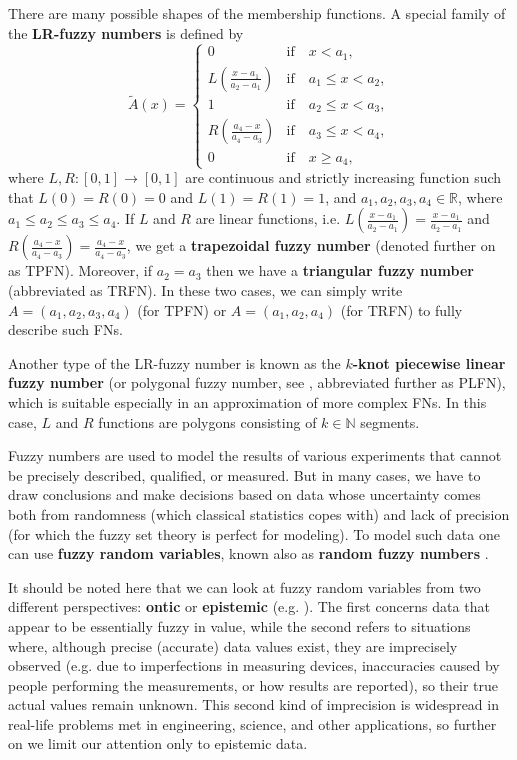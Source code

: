 There are many possible shapes of the membership functions.
A special family of the \textbf{LR-fuzzy numbers} is defined by
\begin{equation}
\tilde{A}(x)=
\begin{cases}
 0 & \text{if}\quad x < a_1,  \\
 L \left( \frac{x-a_1}{a_2 - a_1}\right) & \text{if}\quad a_1 \leqslant x < a_2 ,  \\
 1 & \text{if}\quad a_2 \leqslant x < a_3 , \\
 R \left( \frac{a_4 - x}{a_4 - a_3}\right) & \text{if}\quad a_3 \leqslant x < a_4 , \\
 0 & \text{if}\quad x \geqslant a_4,
\end{cases}
\label{eq:LFfn}
\end{equation}
where $L, R: [0,1] \rightarrow [0,1]$ are continuous and strictly increasing function such that $L(0)=R(0)=0$ and $L(1)=R(1)=1$, and $a_1,a_2,a_3,a_4\in\mathbb{R}$, where $a_1\leqslant a_2\leqslant a_3\leqslant a_4$. If $L$ and $R$ are linear functions, i.e. $L \left( \frac{x-a_1}{a_2 - a_1}\right) = \frac{x-a_1}{a_2 - a_1}$ and $R \left( \frac{a_4 - x}{a_4 - a_3}\right) = \frac{a_4 - x}{a_4 - a_3}$, we get a \textbf{trapezoidal fuzzy number} (denoted further on as TPFN). Moreover, if $a_2=a_3$ then we have a \textbf{triangular fuzzy number} (abbreviated as TRFN).
In these two cases, we can simply write $A=(a_1, a_2, a_3, a_4)$ (for TPFN) or $A = (a_1, a_2, a_4)$ (for TRFN) to fully describe such FNs.

Another type of the LR-fuzzy number is known as the \textbf{$k$-knot piecewise linear fuzzy number} \citep{Coroianu2019} (or polygonal fuzzy number, see \cite{Baez2012}, abbreviated further as PLFN), which is suitable especially in an approximation of more complex FNs.
In this case, $L$ and $R$ functions are polygons consisting of $k\in\mathbb{N}$ segments.

Fuzzy numbers are used to model the results of various experiments that cannot be precisely described, qualified, or measured.
But in many cases, we have to draw conclusions and make decisions based on data whose uncertainty comes both from randomness (which classical statistics copes with) and lack of precision (for which the fuzzy set theory is perfect for modeling). To model such data one can use \textbf{fuzzy random variables}, known also as \textbf{random fuzzy numbers} \citep{FRV}.

It should be noted here that we can look at fuzzy random variables from two different perspectives: \textbf{ontic} or \textbf{epistemic} (e.g. \cite{Couso2014}). The first concerns data that appear to be essentially fuzzy in value, while the second refers to situations where, although precise (accurate) data values exist, they are imprecisely observed (e.g. due to imperfections in measuring devices, inaccuracies caused by people performing the measurements, or how results are reported), so their true actual values remain unknown. This second kind of imprecision is widespread in real-life problems met in engineering, science, and other applications, so further on we limit our attention only to epistemic data.

